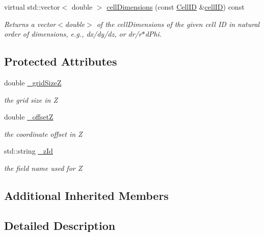 \begin{DoxyCompactItemize}
virtual std\+::vector$<$ double $>$ \hyperlink{class_d_d4hep_1_1_d_d_segmentation_1_1_cartesian_grid_x_y_z_a98f90a0621c750a6bdbcdbb27468b3a1}{cell\+Dimensions} (const \hyperlink{namespace_d_d4hep_1_1_d_d_segmentation_ac7af071d85cb48820914434a07e21ba1}{Cell\+ID} \&\hyperlink{class_d_d4hep_1_1_d_d_segmentation_1_1_cartesian_grid_x_y_z_acc3af2f1d41a94cbb5bb965e8572096a}{cell\+ID}) const
\begin{DoxyCompactList}\small\item\em Returns a vector$<$double$>$ of the cell\+Dimensions of the given cell ID in natural order of dimensions, e.\+g., dx/dy/dz, or dr/r$\ast$d\+Phi. \end{DoxyCompactList}\end{DoxyCompactItemize}
\subsection*{Protected Attributes}
\begin{DoxyCompactItemize}
\item 
double \hyperlink{class_d_d4hep_1_1_d_d_segmentation_1_1_cartesian_grid_x_y_z_a9e67a94e0fb2dfa8d3343c95d9c04ad0}{\+\_\+grid\+SizeZ}
\begin{DoxyCompactList}\small\item\em the grid size in Z \end{DoxyCompactList}\item 
double \hyperlink{class_d_d4hep_1_1_d_d_segmentation_1_1_cartesian_grid_x_y_z_a1578ef683b88f0d4897c354885a488b8}{\+\_\+offsetZ}
\begin{DoxyCompactList}\small\item\em the coordinate offset in Z \end{DoxyCompactList}\item 
std\+::string \hyperlink{class_d_d4hep_1_1_d_d_segmentation_1_1_cartesian_grid_x_y_z_ab6ef126016dd03434b814590c0ca64f9}{\+\_\+z\+Id}
\begin{DoxyCompactList}\small\item\em the field name used for Z \end{DoxyCompactList}\end{DoxyCompactItemize}
\subsection*{Additional Inherited Members}


\subsection{Detailed Description}


